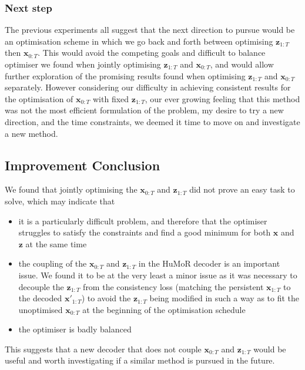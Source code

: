 \subsubsection{Next step}
The previous experiments all suggest that the next direction to pursue would be an optimisation scheme in which we go back and forth between optimising $\mathbf{z}_{1:T}$ then $\mathbf{x}_{0:T}$. This would avoid the competing goals and difficult to balance optimiser we found when jointly optimising $\mathbf{z}_{1:T}$ and $\mathbf{x}_{0:T}$, and would allow further exploration of the promising results found when optimising $\mathbf{z}_{1:T}$ and $\mathbf{x}_{0:T}$ separately. However considering our difficulty in achieving consistent results for the optimisation of $\mathbf{x}_{0:T}$ with fixed $\mathbf{z}_{1:T}$, our ever growing feeling that this method was not the most efficient formulation of the problem, my desire to try a new direction, and the time constraints, we deemed it time to move on and investigate a new method.


\subsection{Improvement Conclusion}

We found that jointly optimising the $\mathbf{x}_{0:T}$ and $\mathbf{z}_{1:T}$ did not prove an easy task to solve, which may indicate that
\begin{itemize}
    \item it is a particularly difficult problem, and therefore that the optimiser struggles to satisfy the constraints and find a good minimum for both $\mathbf{x}$ and $\mathbf{z}$ at the same time
    \item the coupling of the $\mathbf{x}_{0:T}$ and $\mathbf{z}_{1:T}$ in the HuMoR decoder is an important issue. We found it to be at the very least a minor issue as it was necessary to decouple the $\mathbf{z}_{1:T}$ from the consistency loss (matching the persistent $\mathbf{x}_{1:T}$ to the decoded $\mathbf{x'}_{1:T}$) to avoid the $\mathbf{z}_{1:T}$ being modified in such a way as to fit the unoptimised $\mathbf{x}_{0:T}$ at the beginning of the optimisation schedule
    \item the optimiser is badly balanced
\end{itemize}
This suggests that a new decoder that does not couple $\mathbf{x}_{0:T}$ and $\mathbf{z}_{1:T}$ would be useful and worth investigating if a similar method is pursued in the future.

